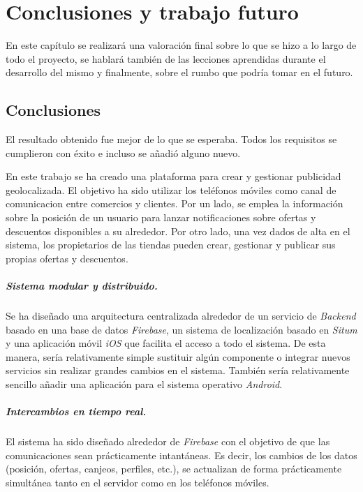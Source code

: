 \chapter{Conclusiones y trabajo futuro}
En este capítulo se realizará una valoración final sobre lo que se hizo a lo largo de todo el proyecto, se hablará también de las lecciones aprendidas durante el desarrollo del mismo y finalmente, sobre el rumbo que podría tomar en el futuro.

\section{Conclusiones}

El resultado obtenido fue mejor de lo que se esperaba. Todos los requisitos se cumplieron con éxito e incluso se añadió alguno nuevo.

En este trabajo se ha creado una plataforma para crear y gestionar publicidad geolocalizada. 
El objetivo ha sido utilizar los teléfonos móviles como
canal de comunicacion entre comercios y clientes.
Por un lado, se emplea la información sobre la  posición de un usuario para lanzar notificaciones sobre ofertas y descuentos disponibles a su alrededor.
Por otro lado, una vez dados de alta en el sistema, los propietarios de las tiendas pueden crear, gestionar y publicar sus propias ofertas y descuentos.

\paragraph{Sistema modular y distribuido.} Se ha diseñado una arquitectura centralizada alrededor de un servicio de \emph{Backend} basado en una base de datos \emph{Firebase}, un sistema de localización basado en \emph{Situm} y una aplicación móvil \emph{iOS} que facilita el acceso a todo el sistema.
De esta manera, sería relativamente simple sustituir algún componente o integrar nuevos servicios sin realizar grandes cambios en el sistema. También sería relativamente sencillo añadir una aplicación para el sistema operativo \emph{Android}.

\paragraph{Intercambios en tiempo real.} El sistema ha sido diseñado alrededor de \emph{Firebase} con el objetivo de que las comunicaciones sean prácticamente intantáneas. Es decir, los cambios de los datos (posición, ofertas, canjeos, perfiles, etc.), se actualizan de forma prácticamente simultánea tanto en el servidor como en los teléfonos móviles.

